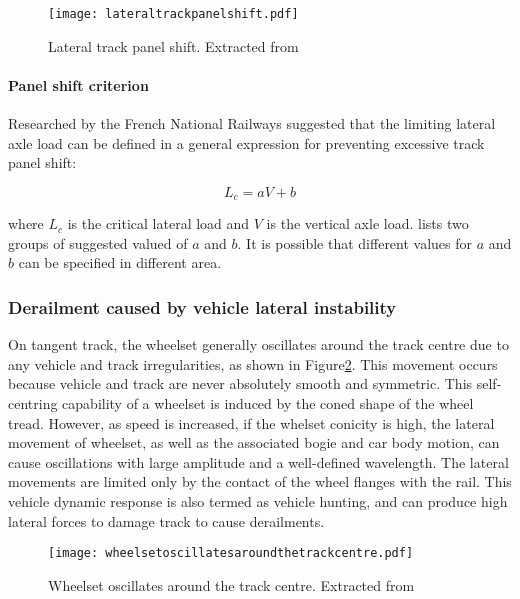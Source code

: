 \begin{figure}[h]
	\centering
	\texttt{[image: lateraltrackpanelshift.pdf]}
	\caption{Lateral track panel shift. Extracted from \cite[Figure8.27]{iwnicki2006handbook}}
	\label{fig:lateraltrackpanelshift}
\end{figure}

\paragraph{Panel shift criterion}
Researched by the French National Railways suggested that the limiting lateral axle load can be defined in a general expression for preventing excessive track panel shift:

\begin{equation}
	L_c = aV+b
\end{equation}

where $L_c$ is the critical lateral load and $V$ is the vertical axle load. \cite[Table 8.2]{iwnicki2006handbook} lists two groups of suggested valued of $a$ and $b$. It is possible that different values for $a$ and $b$ can be specified in different area.

\subsubsection{Derailment caused by vehicle lateral instability}
On tangent track, the wheelset generally oscillates around the track centre due to any vehicle and track irregularities, as shown in Figure\ref{fig:wheelsetoscillatesaroundthetrackcentre}. This movement occurs because vehicle and track are never absolutely smooth and symmetric. This self-centring capability of a wheelset is induced by the coned shape of the wheel tread. However, as speed is increased, if the whelset conicity is high, the lateral movement of wheelset, as well as the associated bogie and car body motion, can cause oscillations with large amplitude  and a well-defined wavelength. The lateral movements are limited only by the contact of the wheel flanges with the rail. This vehicle dynamic response is also termed as vehicle hunting, and can produce high lateral forces to damage track to cause derailments.

\begin{figure}[h]
	\centering
	\texttt{[image: wheelsetoscillatesaroundthetrackcentre.pdf]}
	\caption{Wheelset oscillates around the track centre. Extracted from \cite[Figure8.28]{iwnicki2006handbook}}
	\label{fig:wheelsetoscillatesaroundthetrackcentre}
\end{figure}

